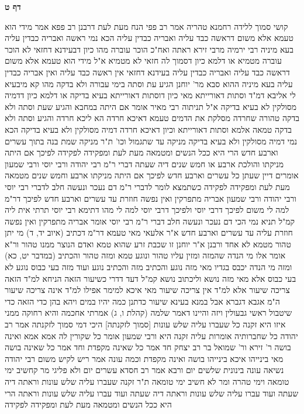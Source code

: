 \documentclass[12pt, openany]{book}
\newcommand{\sethebfont}{
\fontsize{10.5pt}{21.0pt} \selectfont
}
\newcommand{\twocol}[1]{
	{\sethebfont \begin{multicols}{2}
			#1
	\end{multicols}}	
}
\newcommand{\sectname}{}
\newcommand{\newsection}[1]{
	\addcontentsline{toc}{section}{#1}
	\renewcommand{\sectname}{#1}	
	\vspace{-\baselineskip}
	\begin{center}
		\textbf{%
\fontsize{16pt}{16pt}\selectfont
			#1}
	\end{center}
	\vspace{-\baselineskip}
	\nopagebreak
}
\begin{document}
\newsection{דף ט}
\twocol{קושי סמוך ללידה רחמנא טהריה אמר רב פפי הנח מעת לעת דרבנן 
רב פפא אמר מידי הוא טעמא אלא משום דראשה כבד עליה ואבריה כבדין עליה הכא נמי ראשה ואבריה כבדין עליה 
בעא מיניה רבי ירמיה מרבי זירא ראתה ואח"כ הוכר עוברה מהו כיון דבעידנא דחזאי לא הוכר עוברה מטמיא או דלמא כיון דסמוך לה חזאי לא מטמיא 
א"ל מידי הוא טעמא אלא משום דראשה כבד עליה ואבריה כבדין עליה בעידנא דחזאי אין ראשה כבד עליה ואין אבריה כבדין עליה 
בעא מיניה ההוא סבא מר' יוחנן הגיע עת וסתה בימי עבורה ולא בדקה מהו קא מיבעיא לי אליבא דמ"ד וסתות דאורייתא מאי כיון דוסתות דאורייתא בעיא בדיקה או דלמא כיון דדמיה מסולקין לא בעיא בדיקה 
א"ל תניתוה רבי מאיר אומר אם היתה במחבא והגיע שעת וסתה ולא בדקה טהורה שחרדה מסלקת את הדמים טעמא דאיכא חרדה הא ליכא חרדה והגיע וסתה ולא בדקה טמאה
אלמא וסתות דאורייתא וכיון דאיכא חרדה דמיה מסולקין ולא בעיא בדיקה הכא נמי דמיה מסולקין ולא בעיא בדיקה
מניקה עד שתגמול וכו' ת"ר מניקה שמת בנה בתוך עשרים וארבע חדש הרי היא ככל הנשים ומטמאה מעת לעת ומפקידה לפקידה לפיכך אם היתה מניקתו והולכת ארבע או חמש שנים דיה שעתה דברי ר"מ 
רבי יהודה ורבי יוסי ורבי שמעון אומרים דיין שעתן כל עשרים וארבע חדש לפיכך אם היתה מניקתו ארבע וחמש שנים מטמאה מעת לעת ומפקידה לפקידה 
כשתמצא לומר לדברי ר"מ דם נעכר ונעשה חלב לדברי רבי יוסי ורבי יהודה ורבי שמעון אבריה מתפרקין ואין נפשה חוזרת עד עשרים וארבע חדש 
לפיכך דר"מ למה לי משום לפיכך דרבי יוסי 
ולפיכך דרבי יוסי למה לי מהו דתימא רבי יוסי תרתי אית ליה קמ"ל 
תניא נמי הכי דם נעכר ונעשה חלב דברי ר"מ רבי יוסי אומר אבריה מתפרקין ואין נפשה חוזרת עליה עד עשרים וארבע חדש א"ר אלעאי מאי טעמא דר"מ דכתיב (איוב יד, ד) מי יתן טהור מטמא לא אחד 
ורבנן א"ר יוחנן זו שכבת זרע שהוא טמא ואדם הנוצר ממנו טהור 
ור"א אומר אלו מי הנדה שהמזה ומזין עליו טהור ונוגע טמא ומזה טהור והכתיב (במדבר יט, כא) ומזה מי הנדה יכבס בגדיו מאי מזה נוגע 
והכתיב מזה והכתיב נוגע ועוד מזה בעי כבוס נוגע לא בעי כבוס אלא מאי מזה נושא 
וליכתוב נושא קמ"ל דעד דדרי כשיעור הזאה הניחא למ"ד הזאה צריכה שיעור אלא למ"ד אין צריכה שיעור מאי איכא למימר 
אפילו למ"ד אינה צריכה שיעור ה"מ אגבא דגברא אבל במנא בעינא שיעור כדתנן כמה יהיו במים ויהא בהן כדי הזאה כדי שיטבול ראשי גבעולין ויזה 
והיינו דאמר שלמה (קהלת ו, ג) אמרתי אחכמה והיא רחוקה ממני
איזו היא זקנה כל שעברו עליה שלש עונות [סמוך לזקנתה] היכי דמי סמוך לזקנתה אמר רב יהודה כל שחברותיה אומרות עליה זקנה היא ורבי שמעון אומר
כל שקורין לה אמא אמא ואינה בושה ר' זירא ור' שמואל בר רב יצחק חד אמר כל שאינה מקפדת וחד אמר כל שאינה בושה  מאי בינייהו איכא בינייהו בושה ואינה מקפדת 
וכמה עונה אמר ריש לקיש משום רבי יהודה נשיאה עונה בינונית שלשים יום ורבא אמר רב חסדא עשרים יום ולא פליגי מר קחשיב ימי טומאה וימי טהרה ומר לא חשיב ימי טומאה 
ת"ר זקנה שעברו עליה שלש עונות וראתה דיה שעתה ועוד עברו עליה שלש עונות וראתה דיה שעתה ועוד עברו עליה שלש עונות וראתה הרי היא ככל הנשים ומטמאה מעת לעת ומפקידה לפקידה 
}
\end{document}
